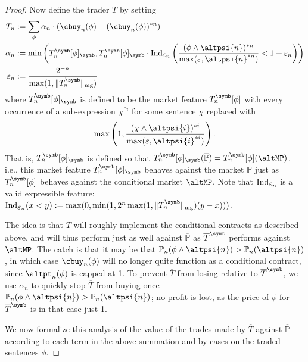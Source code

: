 \documentclass[authordate,onecolumn,noenvironments]{miri-tech-article}
\numberwithin{equation}{subsection}
\newcommand{\seq}[1]{{\overline{#1}}}
\newcommand{\nn}{n}
\newcommand{\trade}{T}%
\newcommand{\Trader}{\seq{\trade}} %
\newcommand{\magnit}[1]{{\|#1\|_{\rm mg}}} %
\newcommand{\BelState}{\mathbb{P}}
\newcommand{\pt}{\BelState}
\newcommand{\MP}{\seq{\pt}}
\newcommand{\ctsind}[1]{\operatorname{Ind}_{\text{\small{${#1}$}}}} %
\begin{document}
\begin{proof}
Now define the trader $\Trader$ by setting
%
\begin{align*}
  \trade_n &:= \sum_{\phi} \alpha_n \cdot (\cbuy_n(\phi) - (\cbuy_\nn(\phi))^{* n} ) \\ 
  \alpha_n &:= \min\left(\trade^\symb_n[\phi]_{\symb}, \trade^\symb_n[\phi]_{\symb}\cdot \ctsind{\varepsilon_n}\left(\frac{(\phi \wedge \altpsi{n})^{* n} }{ \max(\varepsilon, \altpsi{n}^{* n})} < 1 + \varepsilon_n\right) \right)\\
  \varepsilon_n &:= \frac{2^{-n}}{\max(1,\magnit{\trade_n^\symb})}
\end{align*}
%
where $\trade^\symb_n[\phi]_{\symb}$ is defined to be the market feature $\trade^\symb_n[\phi]$ with every occurrence of a sub-expression $\chi^{* i}$ for some sentence $\chi$ replaced with 
%
\[  \max \left( 1,
\frac{(\chi \wedge \altpsi{i})^{* i} }{ \max(\varepsilon, \altpsi{i}^{* i})} \right) .
\]
%
That is, $\trade^\symb_n[\phi]_{\symb}$ is defined so that $\trade^\symb_n[\phi]_{\symb}(\MP) = \trade^\symb_n[\phi](\altMP)$, i.e., this market feature $\trade^\symb_n[\phi]_{\symb}$ behaves against
the market $\MP$ just as $\trade^\symb_n[\phi]$ behaves against the conditional market $\altMP$. Note that $\ctsind{\varepsilon_n}$ is a valid expressible feature: $\ctsind{\varepsilon_n}(x<y) := \max(0,\min(1,2^n\max(1,\magnit{\trade_n^\symb})(y-x) ))$.

The idea is that $\Trader$ will roughly implement the conditional contracts as described above, and will thus perform just as well against $\MP$ as $\Trader^\symb$ performs against $\altMP$. The catch is that it may be that $\pt_n(\phi \wedge \altpsi{n}) > \pt_n( \altpsi{n})$, in which case $\cbuy_n(\phi)$ will no longer quite function as a conditional contract, since $\altpt_n(\phi)$ is capped at 1. To prevent $\Trader$ from losing relative to $\Trader^\symb$, we use $\alpha_n$ to quickly stop $\Trader$ from buying once $\pt_n(\phi \wedge \altpsi{n}) > \pt_n( \altpsi{n})$; no profit is lost, as the price of $\phi$ for $\Trader^\symb$ is in that case just 1.


We now formalize this analysis of the value of the trades made by $\Trader$  against $\MP$ according to each term in the above summation and by cases on the traded sentences $\phi$. 


\end{proof}
\end{document}
